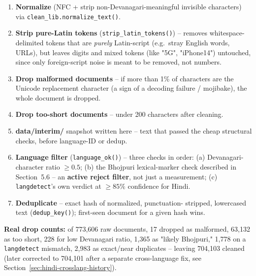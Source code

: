 \documentclass[11pt]{report}
\begin{document}
\begin{enumerate}
\item \textbf{Normalize} (NFC + strip non-Devanagari-meaningful invisible
characters) via \texttt{clean\_lib.normalize\_text()}.
\item \textbf{Strip pure-Latin tokens} (\texttt{strip\_latin\_tokens()})
-- removes whitespace-delimited tokens that are \textit{purely}
Latin-script (e.g.\ stray English words, URLs), but leaves digits and
mixed tokens (like "5G", "iPhone14") untouched, since only foreign-script
noise is meant to be removed, not numbers.
\item \textbf{Drop malformed documents} -- if more than 1\% of characters
are the Unicode replacement character (a sign of a decoding failure /
mojibake), the whole document is dropped.
\item \textbf{Drop too-short documents} -- under 200 characters after
cleaning.
\item[$\to$] \textbf{data/interim/} snapshot written here -- text that
passed the cheap structural checks, before language-ID or dedup.
\item \textbf{Language filter} (\texttt{language\_ok()}) -- three checks
in order: (a) Devanagari-character ratio $\geq 0.5$; (b) the Bhojpuri
lexical-marker check described in Section~5.6 -- an \textbf{active reject
filter}, not just a measurement; (c) \texttt{langdetect}'s own verdict at
$\geq 85\%$ confidence for Hindi.
\item \textbf{Deduplicate} -- exact hash of normalized, punctuation-
stripped, lowercased text (\texttt{dedup\_key()}); first-seen document
for a given hash wins.
\end{enumerate}

\textbf{Real drop counts:} of 773,606 raw documents, 17 dropped as
malformed, 63,132 as too short, 228 for low Devanagari ratio, 1,365 as
"likely Bhojpuri," 1,778 on a \texttt{langdetect} mismatch, 2,983 as
exact/near duplicates -- leaving 704,103 cleaned (later corrected to
704,101 after a separate cross-language fix, see
Section~\ref{sec:hindi-crosslang-history}).
\end{document}
